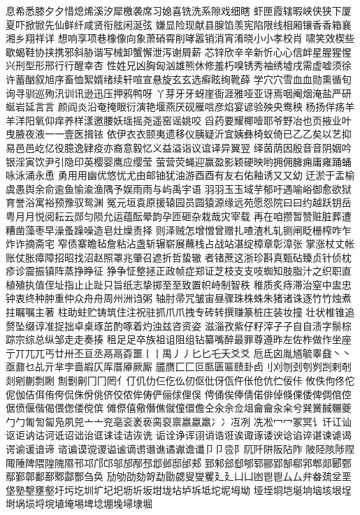 息希悉膝⼣夕惜熄烯溪汐犀檄袭席习媳喜铣洗系隙戏细瞎
虾匣霞辖暇峡侠狭下厦夏吓掀锨先仙鲜纤咸贤衔舷闲涎弦
嫌显险现献县腺馅羡宪陷限线相厢镶⾹香箱襄湘乡翔祥详
想响享项巷橡像向象萧硝霄削哮嚣销消宵淆晓⼩小孝校肖
啸笑效楔些歇蝎鞋协挟携邪斜胁谐写械卸蟹懈泄泻谢屑薪
芯锌欣⾟辛新忻⼼心信衅星腥猩惺兴刑型形邢⾏行醒幸杏
性姓兄凶胸匈汹雄熊休修羞朽嗅锈秀袖绣墟戌需虚嘘须徐
许蓄酗叙旭序畜恤絮婿绪续轩喧宣悬旋⽞玄选癣眩绚靴薛
学⽳穴雪⾎血勋熏循旬询寻驯巡殉汛训讯逊迅压押鸦鸭呀
丫芽⽛牙蚜崖衙涯雅哑亚讶焉咽阉烟淹盐严研蜒岩延⾔言
颜阎炎沿奄掩眼衍演艳堰燕厌砚雁唁彦焰宴谚验殃央鸯秧
杨扬佯疡⽺羊洋阳氧仰痒养样漾邀腰妖瑶摇尧遥窑谣姚咬
舀药要耀椰噎耶爷野冶也页掖业叶曳腋夜液⼀一壹医揖铱
依伊⾐衣颐夷遗移仪胰疑沂宜姨彝椅蚁倚已⼄乙矣以艺抑
易⾢邑屹亿役臆逸肄疫亦裔意毅忆义益溢诣议谊译异翼翌
绎茵荫因殷⾳音阴姻吟银淫寅饮尹引隐印英樱婴鹰应缨莹
萤营荧蝇迎赢盈影颖硬映哟拥佣臃痈庸雍踊蛹咏泳涌永恿
勇⽤用幽优悠忧尤由邮铀犹油游⾣酉有友右佑釉诱⼜又幼
迂淤于盂榆虞愚舆余俞逾鱼愉渝渔隅予娱⾬雨与屿禹宇语
⽻羽⽟玉域芋郁吁遇喻峪御愈欲狱育誉浴寓裕预豫驭鸳渊
冤元垣袁原援辕园员圆猿源缘远苑愿怨院⽈曰约越跃钥岳
粤⽉月悦阅耘云郧匀陨允运蕴酝晕韵孕匝砸杂栽哉灾宰载
再在咱攒暂赞赃脏葬遭糟凿藻枣早澡蚤躁噪造皂灶燥责择
则泽贼怎增憎曾赠扎喳渣札轧铡闸眨栅榨咋乍炸诈摘斋宅
窄债寨瞻毡詹粘沾盏斩辗崭展蘸栈占战站湛绽樟章彰漳张
掌涨杖丈帐账仗胀瘴障招昭找沼赵照罩兆肇召遮折哲蛰辙
者锗蔗这浙珍斟真甄砧臻贞针侦枕疹诊震振镇阵蒸挣睁征
狰争怔整拯正政帧症郑证芝枝⽀支吱蜘知肢脂汁之织职直
植殖执值侄址指⽌止趾只旨纸志挚掷⾄至致置帜峙制智秩
稚质炙痔滞治窒中盅忠钟衷终种肿重仲众⾈舟周州洲诌粥
轴肘帚咒皱宙昼骤珠株蛛朱猪诸诛逐⽵竹烛煮拄瞩嘱主著
柱助蛀贮铸筑住注祝驻抓⽖爪拽专砖转撰赚篆桩庄装妆撞
壮状椎锥追赘坠缀谆准捉拙卓桌琢茁酌啄着灼浊兹咨资姿
滋淄孜紫仔籽滓⼦子⾃自渍字鬃棕踪宗综总纵邹⾛走奏揍
租⾜足卒族祖诅阻组钻纂嘴醉最罪尊遵昨左佐柞做作坐座
亍丌兀兀丐廿卅丕亘丞⿀鬲孬噩⼁丨禺⼃丿⼔匕乇夭⽘爻
卮氐囟胤馗毓睾鼗⼂丶亟鼐乜乩亓芈孛啬嘏仄厍厝厣厥厮
靥赝⼕匚叵匦匮匾赜卦卣刂刈刎刭刳刿剀剌剞剡剜蒯剽劂
劁劐劓⼌冂罔亻仃仉仂仨仡仫仞伛仳伢佤仵伥伧伉伫佞佧
攸佚佝佟佗伲伽佶佴侑侉侃侏佾佻侪佼侬侔俦俨俪俅俚俣
俜俑俟俸倩偌俳倬倏倮倭俾倜倌倥倨偾偃偕偈偎偬偻傥傧
傩傺僖儆僭僬僦僮儇儋仝氽佘佥俎⿕龠汆籴兮巽黉馘冁夔
⼓勹匍訇匐凫夙兕⼇亠兖亳衮袤亵脔裒禀嬴蠃羸⼎冫冱冽
冼凇⼍冖冢冥讠讦讧讪讴讵讷诂诃诋诏诎诒诓诔诖诘诙诜
诟诠诤诨诩诮诰诳诶诹诼诿谀谂谄谇谌谏谑谒谔谕谖谙谛
谘谝谟谠谡谥谧谪谫谮谯谲谳谵谶⼙卩卺阝阢阡阱阪阽阼
陂陉陔陟陧陬陲陴隈隍隗隰邗邛邝邙邬邡邴邳邶邺邸邰郏
郅邾郐郄郇郓郦郢郜郗郛郫郯郾鄄鄢鄞鄣鄱鄯鄹酃酆刍奂
劢劬劭劾哿勐勖勰叟燮矍⼵廴⼐凵凼⾿鬯⼛厶弁畚巯坌垩
垡塾墼壅壑圩圬圪圳圹圮圯坜圻坂坩垅坫垆坼坻坨坭坶坳
垭垤垌垲埏垧垴垓垠埕埘埚埙埒垸埴埯埸埤埝堋堍埽埭堀
